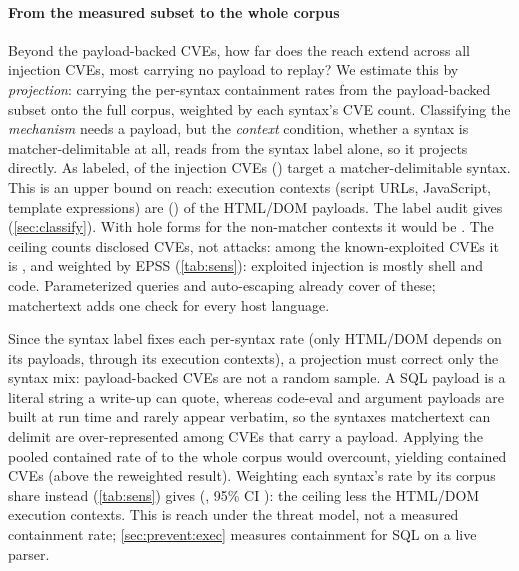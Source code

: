 \paragraph{From the measured subset to the whole corpus}
Beyond the \dataPayloadBackedCVEs payload-backed CVEs,
how far does the reach extend across all \dataInjectionCVEs injection CVEs, most
carrying no payload to replay?
We estimate this by \emph{projection}: carrying the
per-syntax containment rates from the payload-backed subset onto the full corpus,
weighted by each syntax's CVE count.
Classifying the \emph{mechanism} needs a payload, but the \emph{context}
condition, whether a syntax is matcher-delimitable at all, reads from the syntax
label alone, so it projects directly.
As labeled, \textbf{\dataHostableCVEs} of the \textbf{\dataInjectionCVEs} injection
CVEs (\textbf{\dataHostableShare}) target a matcher-delimitable syntax.
This is an upper bound on reach: execution contexts (script URLs, JavaScript,
template expressions) are \textbf{\dataJsSinkRate} (\dataHtmlDomJsSinks) of the
HTML/DOM payloads. The label audit gives \dataAuditHostableShare (\cref{sec:classify}).
With hole forms for the non-matcher contexts it would be
\dataHostableWithNonmatcherShare. The ceiling counts disclosed CVEs, not attacks:
among the \dataKevInjectionCVEs known-exploited CVEs it is \dataKevHostableShare,
and \dataEpssWeightedHostableShare weighted by EPSS (\cref{tab:sens}): exploited
injection is mostly shell and code.
Parameterized queries and auto-escaping already cover \dataPerLanguageOfHostable of
these; matchertext adds one check for every host language.

Since the syntax label fixes each per-syntax rate (only HTML/DOM depends on its
payloads, through its execution contexts), a projection must correct only the
syntax mix: payload-backed CVEs are not a random sample. A SQL payload is a literal string a write-up can quote,
whereas code-eval and argument payloads are built at run time and rarely appear
verbatim, so the syntaxes matchertext can delimit are over-represented among CVEs
that carry a payload. Applying the pooled contained rate of \dataContainedShare to
the whole corpus would overcount, yielding \dataNaiveEstimate contained CVEs
(\dataSkewCost above the reweighted result).
Weighting each syntax's rate by its corpus share instead (\cref{tab:sens})
gives \textbf{\dataCentralEstimate} (\textbf{\dataCentralShare}, 95\% CI
\dataCentralInterval): the \dataHostableShare ceiling less the HTML/DOM
execution contexts.
This is reach under the threat model, not a measured containment rate;
\cref{sec:prevent:exec} measures containment for SQL on a live parser.

